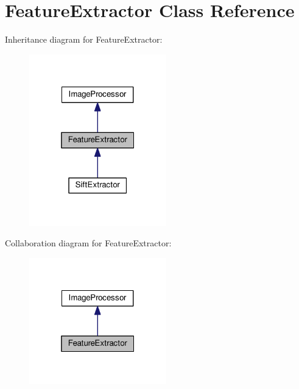 \hypertarget{classFeatureExtractor}{}\section{Feature\+Extractor Class Reference}
\label{classFeatureExtractor}


Inheritance diagram for Feature\+Extractor\+:\nopagebreak
\begin{figure}[H]
\begin{center}
\leavevmode
\includegraphics[width=169pt]{classFeatureExtractor__inherit__graph}
\end{center}
\end{figure}


Collaboration diagram for Feature\+Extractor\+:\nopagebreak
\begin{figure}[H]
\begin{center}
\leavevmode
\includegraphics[width=169pt]{classFeatureExtractor__coll__graph}
\end{center}
\end{figure}
